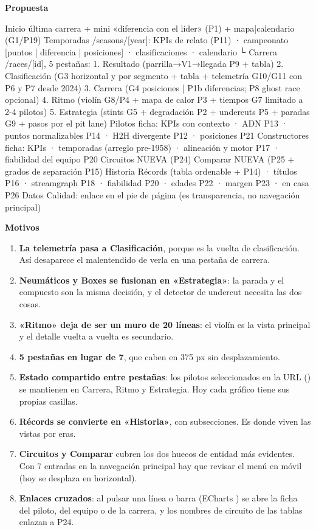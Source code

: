 \textbf{Propuesta}

\begin{codigo}
Inicio          última carrera + mini «diferencia con el líder» (P1) + mapa|calendario (G1/P19)
Temporadas      /seasons/[year]: KPIs de relato (P11) · campeonato [puntos | diferencia | posiciones] · clasificaciones · calendario
  └ Carrera     /races/[id], 5 pestañas:
                 1. Resultado       (parrilla→V1→llegada P9 + tabla)
                 2. Clasificación   (G3 horizontal y por segmento + tabla + telemetría G10/G11 con P6 y P7 desde 2024)
                 3. Carrera         (G4 posiciones | P1b diferencias; P8 ghost race opcional)
                 4. Ritmo           (violín G8/P4 + mapa de calor P3 + tiempos G7 limitado a 2-4 pilotos)
                 5. Estrategia      (stints G5 + degradación P2 + undercuts P5 + paradas G9 + pasos por el pit lane)
Pilotos         ficha: KPIs con contexto · ADN P13 · puntos normalizables P14 · H2H divergente P12 · posiciones P21
Constructores   ficha: KPIs · temporadas (arreglo pre-1958) · alineación y motor P17 · fiabilidad del equipo P20
Circuitos       NUEVA (P24)
Comparar        NUEVA (P25 + grados de separación P15)
Historia        Récords (tabla ordenable + P14) · títulos P16 · streamgraph P18 · fiabilidad P20 · edades P22 · margen P23 · en casa P26
Datos           Calidad: enlace en el pie de página (es transparencia, no navegación principal)
\end{codigo}

\textbf{Motivos}

\begin{enumerate}
\item \textbf{La telemetría pasa a Clasificación}, porque es la vuelta de clasificación. Así desaparece el malentendido de verla en una pestaña de carrera.
\item \textbf{Neumáticos y Boxes se fusionan en «Estrategia»}: la parada y el compuesto son la misma decisión, y el detector de undercut necesita las dos cosas.
\item \textbf{«Ritmo» deja de ser un muro de 20 líneas}: el violín es la vista principal y el detalle vuelta a vuelta es secundario.
\item \textbf{5 pestañas en lugar de 7}, que caben en 375 px sin desplazamiento.
\item \textbf{Estado compartido entre pestañas}: los pilotos seleccionados en la URL () se mantienen en Carrera, Ritmo y Estrategia. Hoy cada gráfico tiene sus propias casillas.
\item \textbf{Récords se convierte en «Historia»}, con subsecciones. Es donde viven las vistas por eras.
\item \textbf{Circuitos y Comparar} cubren los dos huecos de entidad más evidentes. Con 7 entradas en la navegación principal hay que revisar el menú en móvil (hoy se desplaza en horizontal).
\item \textbf{Enlaces cruzados}: al pulsar una línea o barra (ECharts ) se abre la ficha del piloto, del equipo o de la carrera, y los nombres de circuito de las tablas enlazan a P24.
\end{enumerate}

